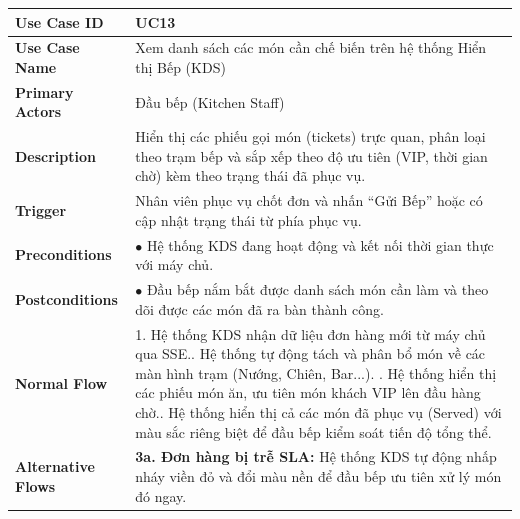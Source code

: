 \begin{longtable}{|p{3.5cm}|p{12.5cm}|}
\hline
\textbf{Use Case ID} & UC13 \\ \hline
\textbf{Use Case Name} & Xem danh sách các món cần chế biến trên hệ thống Hiển thị Bếp (KDS) \\ \hline
\textbf{Primary Actors} & Đầu bếp (Kitchen Staff) \\ \hline
\textbf{Description} & Hiển thị các phiếu gọi món (tickets) trực quan, phân loại theo trạm bếp và sắp xếp theo độ ưu tiên (VIP, thời gian chờ) kèm theo trạng thái đã phục vụ. \\ \hline
\textbf{Trigger} & Nhân viên phục vụ chốt đơn và nhấn ``Gửi Bếp'' hoặc có cập nhật trạng thái từ phía phục vụ. \\ \hline
\textbf{Preconditions} & $\bullet$ Hệ thống KDS đang hoạt động và kết nối thời gian thực với máy chủ. \\ \hline
\textbf{Postconditions} & $\bullet$ Đầu bếp nắm bắt được danh sách món cần làm và theo dõi được các món đã ra bàn thành công. \\ \hline
\textbf{Normal Flow} &
1. Hệ thống KDS nhận dữ liệu đơn hàng mới từ máy chủ qua SSE.\newline
2. Hệ thống tự động tách và phân bổ món về các màn hình trạm (Nướng, Chiên, Bar...). \newline
3. Hệ thống hiển thị các phiếu món ăn, ưu tiên món khách VIP lên đầu hàng chờ.\newline
4. Hệ thống hiển thị cả các món đã phục vụ (Served) với màu sắc riêng biệt để đầu bếp kiểm soát tiến độ tổng thể. \\ \hline
\textbf{Alternative Flows} &
\textbf{3a. Đơn hàng bị trễ SLA:} Hệ thống KDS tự động nhấp nháy viền đỏ và đổi màu nền để đầu bếp ưu tiên xử lý món đó ngay. \\ \hline
\end{longtable}

